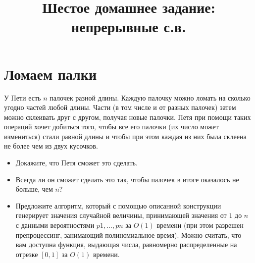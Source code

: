 \documentclass[12pt]{article}
\title{Шестое домашнее задание: непрерывные с.в.}
\begin{document}
\maketitle

\section{Ломаем палки}

У Пети есть $n$ палочек разной длины. Каждую палочку можно ломать на сколько угодно частей любой длины. Части (в том числе и от разных палочек) затем можно склеивать друг с другом, получая новые палочки. Петя при помощи таких операций хочет добиться того, чтобы все его палочки (их число может измениться) стали равной длины и чтобы при этом каждая из них была склеена не более чем из двух кусочков.
\begin{itemize}
    \item Докажите, что Петя сможет это сделать.
    \item Всегда ли он сможет сделать это так, чтобы палочек в итоге оказалось не больше, чем $n$?
    \item Предложите алгоритм, который с помощью описанной конструкции генерирует значения случайной величины, принимающей значения от $1$ до $n$ с данными вероятностями $p1, \dots, pn$ за $O(1)$ времени (при этом разрешен препроцессинг, занимающий полиномиальное время). Можно считать, что вам доступна функция, выдающая числа, равномерно распределенные на отрезке $[0, 1]$ за $O(1)$ времени. 
\end{itemize}
\end{document}
